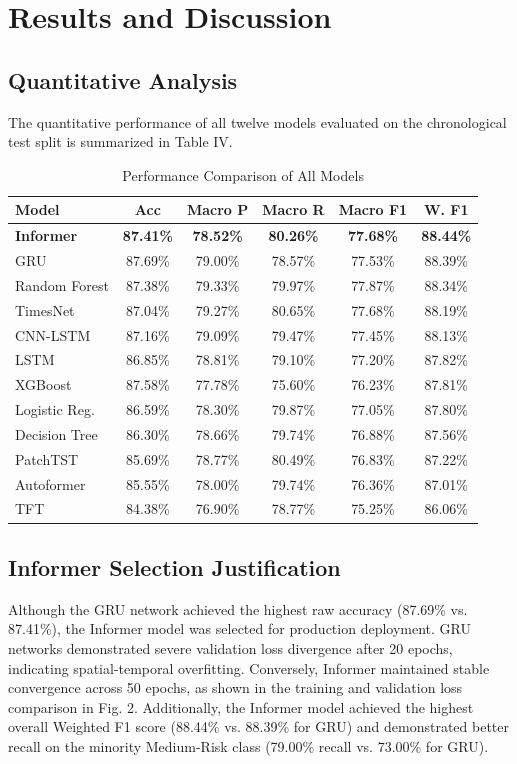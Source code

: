 \section{Results and Discussion}
\subsection{Quantitative Analysis}
The quantitative performance of all twelve models evaluated on the chronological test split is summarized in Table IV.

\begin{table}[htbp]
\caption{Performance Comparison of All Models}
\centering
\begin{tabular}{lccccc}
\toprule
\textbf{Model} & \textbf{Acc} & \textbf{Macro P} & \textbf{Macro R} & \textbf{Macro F1} & \textbf{W. F1} \\
\midrule
\textbf{Informer} & \textbf{87.41\%} & \textbf{78.52\%} & \textbf{80.26\%} & \textbf{77.68\%} & \textbf{88.44\%} \\
GRU & 87.69\% & 79.00\% & 78.57\% & 77.53\% & 88.39\% \\
Random Forest & 87.38\% & 79.33\% & 79.97\% & 77.87\% & 88.34\% \\
TimesNet & 87.04\% & 79.27\% & 80.65\% & 77.68\% & 88.19\% \\
CNN-LSTM & 87.16\% & 79.09\% & 79.47\% & 77.45\% & 88.13\% \\
LSTM & 86.85\% & 78.81\% & 79.10\% & 77.20\% & 87.82\% \\
XGBoost & 87.58\% & 77.78\% & 75.60\% & 76.23\% & 87.81\% \\
Logistic Reg. & 86.59\% & 78.30\% & 79.87\% & 77.05\% & 87.80\% \\
Decision Tree & 86.30\% & 78.66\% & 79.74\% & 76.88\% & 87.56\% \\
PatchTST & 85.69\% & 78.77\% & 80.49\% & 76.83\% & 87.22\% \\
Autoformer & 85.55\% & 78.00\% & 79.74\% & 76.36\% & 87.01\% \\
TFT & 84.38\% & 76.90\% & 78.77\% & 75.25\% & 86.06\% \\
\bottomrule
\end{tabular}
\end{table}

\subsection{Informer Selection Justification}
Although the GRU network achieved the highest raw accuracy (87.69\% vs. 87.41\%), the Informer model was selected for production deployment. GRU networks demonstrated severe validation loss divergence after 20 epochs, indicating spatial-temporal overfitting. Conversely, Informer maintained stable convergence across 50 epochs, as shown in the training and validation loss comparison in Fig. 2. Additionally, the Informer model achieved the highest overall Weighted F1 score (88.44\% vs. 88.39\% for GRU) and demonstrated better recall on the minority Medium-Risk class (79.00\% recall vs. 73.00\% for GRU).

